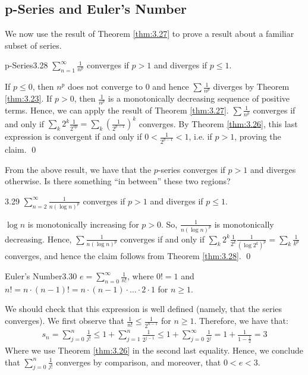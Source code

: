 \subsection{p-Series and Euler's Number}
We now use the result of Theorem \ref{thm:3.27} to prove a result about a familiar subset of series.

\begin{theorem}{p-Series}{3.28}
    $\sum_{n=1}^\infty \frac{1}{n^p}$ converges if $p > 1$ and diverges if $p \leq 1$. 
\end{theorem}
\begin{nproof}
    If $p \leq 0$, then $n^p$ does not converge to $0$ and hence $\sum \frac{1}{n^p}$ diverges by Theorem \ref{thm:3.23}. If $p > 0$, then $\frac{1}{n^p}$ is a monotonically decreasing sequence of positive terms. Hence, we can apply the result of Theorem \ref{thm:3.27}. $\sum \frac{1}{n^p}$ converges if and only if $\sum_k 2^k \frac{1}{2^{kp}} = \sum_k \left(\frac{1}{2^{p-1}}\right)^k$ converges. By Theorem \ref{thm:3.26}, this last expression is convergent if and only if $0 < \frac{1}{2^{p-1}} < 1$, i.e. if $p > 1$, proving the claim. \qed
\end{nproof}
\noindent From the above result, we have that the $p$-series converges if $p > 1$ and diverges otherwise. Is there something ``in between'' these two regions?

\begin{theorem}{}{3.29}
    $\sum_{n=2}^\infty \frac{1}{n(\log n)^p}$ converges if $p > 1$ and diverges if $p \leq 1$.
\end{theorem}
\begin{nproof}
    $\log n$ is monotonically increasing for $p > 0$. So, $\frac{1}{n(\log n)^p}$ is monotonically decreasing. Hence, $\sum \frac{1}{n(\log n)^p}$ converges if and only if $\sum_k 2^k \frac{1}{2^k}\frac{1}{(\log 2^k)^p} = \sum_k \frac{1}{k^p}$ converges, and hence the claim follows from Theorem \ref{thm:3.28}. \qed
\end{nproof}

\begin{definition}{Euler's Number}{3.30}
    $e = \sum_{n=0}^\infty \frac{1}{n!}$, where $0! = 1$ and $n! = n\cdot (n-1)! = n \cdot (n-1) \cdot \ldots \cdot 2 \cdot 1$ for $n \geq 1$. 
\end{definition}
\noindent We should check that this expression is well defined (namely, that the series converges). We first observe that $\frac{1}{n!} \leq \frac{1}{2^{n-1}}$ for $n \geq 1$. Therefore, we have that:
\begin{align*}
    s_n = \sum_{j=0}^n \frac{1}{j!} \leq 1 + \sum_{j=1}^n \frac{1}{2^{j-1}} \leq 1 + \sum_{j=0}^\infty \frac{1}{2^j} = 1 + \frac{1}{1-\frac{1}{2}} = 3
\end{align*}
Where we use Theorem \ref{thm:3.26} in the second last equality. Hence, we conclude that $\sum_{j=0}^n \frac{1}{j!}$ converges by comparison, and moreover, that $0 < e < 3$. 

